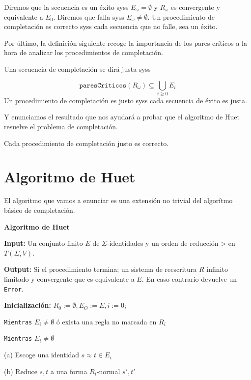 Diremos que la secuencia es un éxito syss $E_\omega = \emptyset$ y
$R_\omega$ es convergente y equivalente a $E_0$. Diremos que falla
syss $E_\omega \not = \emptyset$. Un procedimiento de completación es
correcto syss cada secuencia que no falle, sea un éxito.

Por último, la definición siguiente recoge la importancia de los pares
críticos a la hora de analizar los procedimientos de completación.

\begin{defi}
  Una secuencia de completación se dirá justa syss

  \[
\texttt{paresCriticos}(R_\omega) \subseteq \bigcup_{i\geq 0} E_i
\]
Un procedimiento de completación es justo syss cada secuencia de éxito
es justa.
\end{defi}

Y enunciamos el resultado que nos ayudará a probar que el algoritmo de
Huet resuelve el problema de completación.

\begin{teor}
  Cada procedimiento de completación justo es correcto.
\end{teor}


\section{Algoritmo de Huet}

El algoritmo que vamos a enunciar es una extensión no trivial del
algorítmo básico de completación.

\textbf{Algoritmo de Huet} \hrulefill

\textbf{Input:} Un conjunto finito $E$ de $\Sigma$-identidades y un
orden de reducción > en $T(\Sigma, V)$.

\textbf{Output:} Si el procedimiento termina; un sistema de
reescritura $R$ infinito limitado y convergente que es equivalente a
$E$. En caso contrario devuelve un \texttt{Error}.

\textbf{Inicialización:}
$R_0 := \emptyset, E_O := E, i:= 0;$

\texttt{Mientras} $E_i \not = \emptyset$ ó exista una regla no marcada
en $R_i$

\hspace{0.5cm} \texttt{Mientras} $E_i \not = \emptyset$

\hspace{0.5cm} (a) Escoge una identidad $s \approx t \in E_i$

\hspace{0.5cm} (b) Reduce $s,t$ a una forma $R_i$-normal $s',t'$

